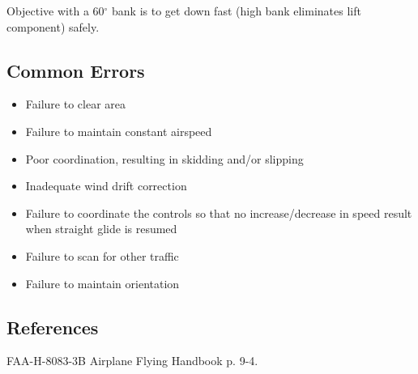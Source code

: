Objective with a 60$^\circ$ bank is to get down fast (high bank eliminates lift
component) safely.

\subsection{Common Errors}

\begin{itemize}
  \item Failure to clear area
  \item Failure to maintain constant airspeed
  \item Poor coordination, resulting in skidding and/or slipping
  \item Inadequate wind drift correction
  \item Failure to coordinate the controls so that no increase/decrease in
    speed result when straight glide is resumed
  \item Failure to scan for other traffic
  \item Failure to maintain orientation
\end{itemize}

\subsection{References}

FAA-H-8083-3B Airplane Flying Handbook p. 9-4.

